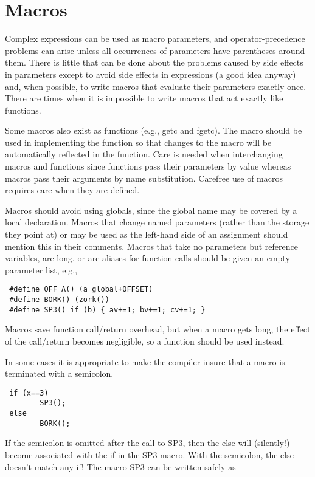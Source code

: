 \section{Macros}

 Complex expressions can be used as macro parameters, and operator-precedence
problems can arise unless all occurrences of parameters have parentheses around
them. There is little that can be done about the problems caused by side
effects in parameters except to avoid side effects in expressions (a good idea
anyway) and, when possible, to write macros that evaluate their parameters
exactly once. There are times when it is impossible to write macros that act
exactly like functions. 

 Some macros also exist as functions (e.g., getc and fgetc). The macro should
be used in implementing the function so that changes to the macro will be
automatically reflected in the function. Care is needed when interchanging
macros and functions since functions pass their parameters by value whereas
macros pass their arguments by name substitution. Carefree use of macros
requires care when they are defined. 

 Macros should avoid using globals, since the global name may be covered by a
local declaration. Macros that change named parameters (rather than the storage
they point at) or may be used as the left-hand side of an assignment should
mention this in their comments. Macros that take no parameters but reference
variables, are long, or are aliases for function calls should be given an empty
parameter list, e.g., 

\begin{verbatim}
 #define OFF_A() (a_global+OFFSET)
 #define BORK() (zork())
 #define SP3() if (b) { av+=1; bv+=1; cv+=1; } 
\end{verbatim}

 Macros save function call/return overhead, but when a macro gets long, the
effect of the call/return becomes negligible, so a function should be used
instead. 

 In some cases it is appropriate to make the compiler insure that a macro is
terminated with a semicolon. 

\begin{verbatim}
 if (x==3)
        SP3();
 else
        BORK(); 
\end{verbatim}

If the semicolon is omitted after the call to SP3, then the else will
(silently!) become associated with the if in the SP3 macro. With the semicolon,
the else doesn't match any if! The macro SP3 can be written safely as 

